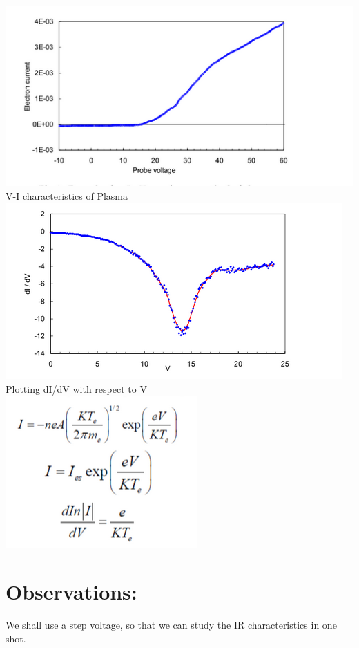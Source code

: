 \documentclass[]{report}[12 pt]
\begin{document}
\begin{center}
	\includegraphics{lp3.png}\\
	V-I characteristics of Plasma\\
	\includegraphics{lp4.png}\\
	Plotting dI/dV with respect to V\\
	\includegraphics[width=5 cm]{lp5.png}\\
\end{center}

\section*{Observations:}
We shall use a step voltage, so that we can study the IR characteristics in one shot.
\end{document}
